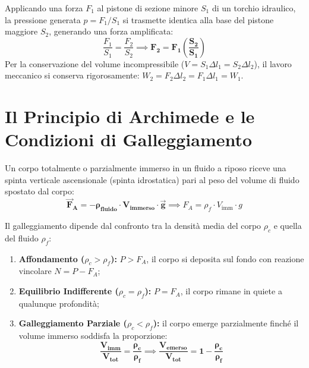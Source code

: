 \documentclass[11pt,a4paper,oneside]{report}
\begin{document}
Applicando una forza $F_1$ al pistone di sezione minore $S_1$ di un torchio idraulico, la pressione generata $p = F_1 / S_1$ si trasmette identica alla base del pistone maggiore $S_2$, generando una forza amplificata:
\[
\frac{F_1}{S_1} = \frac{F_2}{S_2} \implies \mathbf{F_2 = F_1 \left(\frac{S_2}{S_1}\right)}
\]
Per la conservazione del volume incompressibile ($V = S_1 \Delta l_1 = S_2 \Delta l_2$), il lavoro meccanico si conserva rigorosamente: $W_2 = F_2 \Delta l_2 = F_1 \Delta l_1 = W_1$.

\section{Il Principio di Archimede e le Condizioni di Galleggiamento}

\begin{leggefisica}
Un corpo totalmente o parzialmente immerso in un fluido a riposo riceve una spinta verticale ascensionale (spinta idrostatica) pari al peso del volume di fluido spostato dal corpo:
\[
\mathbf{\vec{F}_A = - \rho_{\text{fluido}} \cdot V_{\text{immerso}} \cdot \vec{g}} \implies F_A = \rho_f \cdot V_{\text{imm}} \cdot g
\]
\end{leggefisica}

Il galleggiamento dipende dal confronto tra la densit\`a media del corpo $\rho_c$ e quella del fluido $\rho_f$:
\begin{enumerate}
  \item \textbf{Affondamento ($\rho_c > \rho_f$):} $P > F_A$, il corpo si deposita sul fondo con reazione vincolare $N = P - F_A$;
  \item \textbf{Equilibrio Indifferente ($\rho_c = \rho_f$):} $P = F_A$, il corpo rimane in quiete a qualunque profondit\`a;
  \item \textbf{Galleggiamento Parziale ($\rho_c < \rho_f$):} il corpo emerge parzialmente finch\'e il volume immerso soddisfa la proporzione:
  \[
  \mathbf{\frac{V_{\text{imm}}}{V_{\text{tot}}} = \frac{\rho_c}{\rho_f}} \implies \mathbf{\frac{V_{\text{emerso}}}{V_{\text{tot}}} = 1 - \frac{\rho_c}{\rho_f}}
  \]
\end{enumerate}
\end{document}

